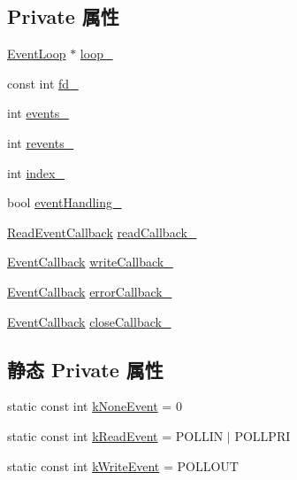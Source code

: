 \subsection*{Private 属性}
\begin{DoxyCompactItemize}
\item 
\hyperlink{classmuduo_1_1EventLoop}{Event\+Loop} $\ast$ \hyperlink{classmuduo_1_1Channel_a19968f50018d32ac31f5cba0195591ac}{loop\+\_\+}
\item 
const int \hyperlink{classmuduo_1_1Channel_a09562e53209b1f330f5139f6eccce269}{fd\+\_\+}
\item 
int \hyperlink{classmuduo_1_1Channel_a42e49f2f857ee5a1a8e3d7dead16e988}{events\+\_\+}
\item 
int \hyperlink{classmuduo_1_1Channel_a57a0ca4614e5a2696d0dc1ca7e6cc72d}{revents\+\_\+}
\item 
int \hyperlink{classmuduo_1_1Channel_aaaf1ac02dfa554a3cdffc647d512a77b}{index\+\_\+}
\item 
bool \hyperlink{classmuduo_1_1Channel_adde382716a55887e3b6e9cec9d615380}{event\+Handling\+\_\+}
\item 
\hyperlink{classmuduo_1_1Channel_a9523d5df2fdb848727cf98870dba0000}{Read\+Event\+Callback} \hyperlink{classmuduo_1_1Channel_a48142903e7199fc704ef449f4a7c75ee}{read\+Callback\+\_\+}
\item 
\hyperlink{classmuduo_1_1Channel_aba4530f63bcce7091a51e66d01f4d2cb}{Event\+Callback} \hyperlink{classmuduo_1_1Channel_a1d5ee91b83f4499ea0a52c5491113169}{write\+Callback\+\_\+}
\item 
\hyperlink{classmuduo_1_1Channel_aba4530f63bcce7091a51e66d01f4d2cb}{Event\+Callback} \hyperlink{classmuduo_1_1Channel_a8790ab985c8b1ca29f4eed435635b4b0}{error\+Callback\+\_\+}
\item 
\hyperlink{classmuduo_1_1Channel_aba4530f63bcce7091a51e66d01f4d2cb}{Event\+Callback} \hyperlink{classmuduo_1_1Channel_a97e25dcb601312c3c9b94e4cfa56865c}{close\+Callback\+\_\+}
\end{DoxyCompactItemize}
\subsection*{静态 Private 属性}
\begin{DoxyCompactItemize}
\item 
static const int \hyperlink{classmuduo_1_1Channel_a7873ae2887674cb643986d9f04745444}{k\+None\+Event} = 0
\item 
static const int \hyperlink{classmuduo_1_1Channel_a7a33491041233f79f0686805e1844694}{k\+Read\+Event} = P\+O\+L\+L\+IN $\vert$ P\+O\+L\+L\+P\+RI
\item 
static const int \hyperlink{classmuduo_1_1Channel_a050e3f1da6130199bfa2619a60e43f3b}{k\+Write\+Event} = P\+O\+L\+L\+O\+UT
\end{DoxyCompactItemize}


